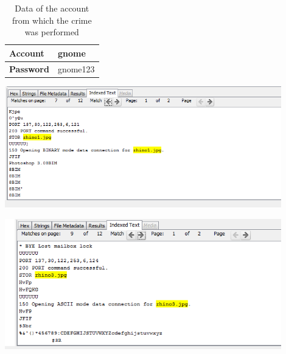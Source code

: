 \documentclass{article}
\begin{document}
\begin{table}[h!]
	\centering
	\begin{tabular}{l|l}
		\textbf{Account} & gnome\\
		\hline
		\textbf{Password} & gnome123\\
	\end{tabular}
	\caption{Data of the account from which the crime was performed}
	\label{tab:account}
\end{table}

\begin{minipage}[h]{0.45\textwidth}
	\centering
	\vspace{0.5cm}
	\includegraphics[width=0.9\textwidth]{img/rhino1inrhinolog.png}
	\vspace{1cm}
	\label{fig:rhino1}
\end{minipage}
\hspace{0.5cm}
\begin{minipage}[h]{0.45\textwidth}
	\centering
	\vspace{0.5cm}
	\includegraphics[width=0.9\textwidth]{img/rhino3inrhinolog.png}
	\vspace{1cm}
	\label{fig:rhino3}
\end{minipage}
\end{document}
